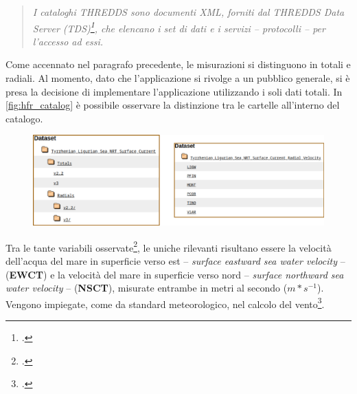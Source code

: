 \documentclass[./main.tex]{subfiles}
\begin{document}
\begin{quote}
\textit{I cataloghi THREDDS sono documenti XML, forniti dal THREDDS Data Server (TDS)\footcite[\url{https://doi.org/10.5065/D6N014KG}]{website-unidata-ucar-edu}, che elencano i set di dati e i servizi -- \textit{protocolli} -- per l'accesso ad essi.}
\end{quote}

Come accennato nel paragrafo precedente, le misurazioni si distinguono in totali e radiali. Al momento, dato che l'applicazione si rivolge a un pubblico generale, si è presa la decisione di implementare l'applicazione utilizzando i soli dati totali. In \autoref{fig:hfr_catalog} è possibile osservare la distinzione tra le cartelle all'interno del catalogo.

\begin{figure}[!ht]
\noindent\begin{minipage}{\textwidth}
\vspace{1cm}
\includegraphics[width=\textwidth]{images/hfr_catalog.pdf}
\captionsetup{font=small, hypcap=false}
\label{fig:hfr_catalog}
\end{minipage}
\vspace{0.25cm}
\end{figure}

Tra le tante variabili osservate\footcite[40-50]{HFR_QC_JERICO}, le uniche rilevanti risultano essere la velocità dell'acqua del mare in superficie verso est --  \textit{surface eastward sea water velocity} -- (\textbf{EWCT}) e la velocità del mare in superficie verso nord -- \textit{surface northward sea water velocity} -- (\textbf{NSCT}), misurate entrambe in metri al secondo ($m*s^{-1}$). Vengono impiegate, come da standard meteorologico, nel calcolo del vento\footcite[\url{https://confluence.ecmwf.int/pages/viewpage.action?pageId=111155337}]{website-ecmwf-confluence}.
\end{document}
